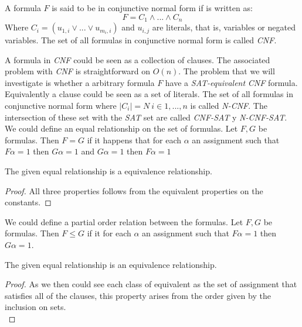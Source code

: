 	
	
\begin{definition}
	A formula $F$ is said to be in conjunctive normal form if is written as:
	$$F = C_1\wedge ... \wedge C_n$$
	Where $C_i = (u_{1,i} \vee ... \vee u_{m_i,i})$  and $u_{i,j}$ are literals, that is, variables or negated variables. The set of all formulas in conjunctive normal form is called \emph{CNF}.
\end{definition}
	
A formula in \emph{CNF} could be seen as a collection of clauses. The associated problem with \emph{CNF} is straightforward on $O(n)$. The problem that we will investigate is whether a arbitrary formula $F$ have a \emph{SAT-equivalent} \emph{CNF} formula.
Equivalently a clause could be seen as a set of literals. The set of all formulas in conjunctive normal form where $|C_i| = N\ i \in 1,...,n$ is called \emph{N-CNF}. The intersection of these set with the \emph{SAT} set are called \emph{CNF-SAT} y \emph{N-CNF-SAT}.\\


	We could define an equal relationship on the set of formulas. Let $F,G$ be formulas. Then $F= G$ if it happens that for each $\alpha$ an assignment such that $F\alpha = 1$ then $G\alpha = 1$ and $G\alpha = 1$ then $F\alpha = 1$

\begin{proposition} 
	The given equal relationship is a equivalence relationship.
\end{proposition}
\begin{proof}
	All three properties follows from the equivalent properties on the constants.

        \end{proof}
	
	
	We could define a partial order relation between the formulas.	Let $F,G$ be formulas. Then $F\le G$ if it for each $\alpha$ an assignment such that $F\alpha = 1$ then $G\alpha = 1$. \\
	
	
\begin{proposition} 
	The given equal relationship is an equivalence relationship.
\end{proposition}
\begin{proof}
As we then could see each class of equivalent as the set of assignment that satisfies all of the clauses, this property arises from the order given by the inclusion on sets.\\
\end{proof}
	
